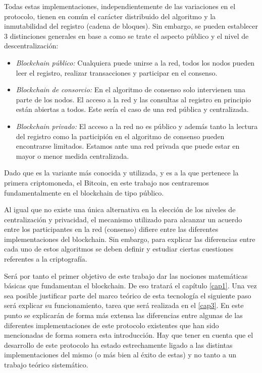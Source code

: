 Todas estas implementaciones, independientemente de las variaciones en el protocolo, tienen en común el carácter distribuido del algoritmo y la inmutabilidad del registro (cadena de bloques). Sin embargo, se pueden establecer 3 distinciones generales en base a como se trate el aspecto público y el nivel de  descentralización:
\begin{itemize}
\item \textit{Blockchain público:} Cualquiera puede unirse a la red, todos los nodos pueden leer el registro, realizar transacciones y participar en el consenso.
\item \textit{Blockchain de consorcio:} En el algoritmo de consenso solo intervienen una parte de los nodos. El acceso a la red y las consultas al registro en principio están abiertas a todos. Este sería el caso de una red pública y centralizada.
\item \textit{Blockchain privado:} El acceso a la red no es público y además tanto la lectura del registro como la participión en el algoritmo de consenso pueden encontrarse limitados. Estamos ante una red privada que puede estar en mayor o menor medida centralizada.
\end{itemize}

Dado que es la variante más conocida y utilizada, y es a la que pertenece la primera criptomoneda, el Bitcoin, en este trabajo nos centraremos fundamentalmente en el blockchain de tipo público. 


Al igual que no existe una única alternativa en la elección de los niveles de centralización y privacidad, el mecanismo utilizado para alcanzar un acuerdo entre los participantes en la red (consenso) difiere entre las diferentes implementaciones del blockchain. Sin embargo, para explicar las diferencias entre cada uno de estos algoritmos se deben definir y estudiar ciertas cuestiones referentes a la criptografía.%

Será por tanto el primer objetivo de este trabajo dar las nociones matemáticas básicas que fundamentan el blockchain. De eso tratará el capítulo \ref{cap1}. Una vez sea posible justificar parte del marco teórico de esta tecnología el siguiente paso será explicar su funcionamiento, tarea que será realizada en el \ref{cap3}. En este punto se explicarán de forma más extensa las diferencias entre algunas de las diferentes implementaciones de este protocolo existentes que han sido mencionadas de forma somera esta introducción. Hay que tener en cuenta que el desarrollo de este protocolo ha estado estrechamente ligado a las distintas implementaciones del mismo (o más bien al éxito de estas) y no tanto a un trabajo teórico sistemático. 

